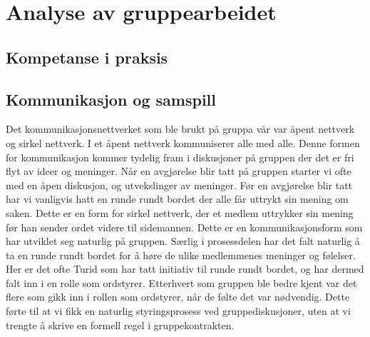 
\chapter{Analyse av gruppearbeidet}

\section{Kompetanse i praksis}

\section{Kommunikasjon og samspill}
Det kommunikasjonsnettverket som ble brukt på gruppa vår var åpent nettverk og sirkel nettverk. I et åpent nettverk kommuniserer alle med alle. Denne formen for kommunikasjon kommer tydelig fram i diskusjoner på gruppen der det er fri flyt av ideer og meninger. Når en avgjørelse blir tatt på gruppen starter vi ofte med en åpen diskusjon, og utvekslinger av meninger. Før en avgjørelse blir tatt har vi vanligvis hatt en runde rundt bordet der alle får uttrykt sin mening om saken. Dette er en form for sirkel nettverk, der et medlem uttrykker sin mening før han sender ordet videre til sidemannen. Dette er en kommunikasjonsform som har utviklet seg naturlig på gruppen. Særlig i prosessdelen har det falt naturlig å ta en runde rundt bordet for å høre de ulike medlemmenes meninger og følelser. Her er det ofte Turid som har tatt initiativ til runde rundt bordet, og har dermed falt inn i en rolle som ordstyrer. Etterhvert som gruppen ble bedre kjent var det flere som gikk inn i rollen som ordstyrer, når de følte det var nødvendig. Dette førte til at vi fikk en naturlig styringsprosess ved gruppediskusjoner, uten at vi trengte å skrive en formell regel i gruppekontrakten.\\

